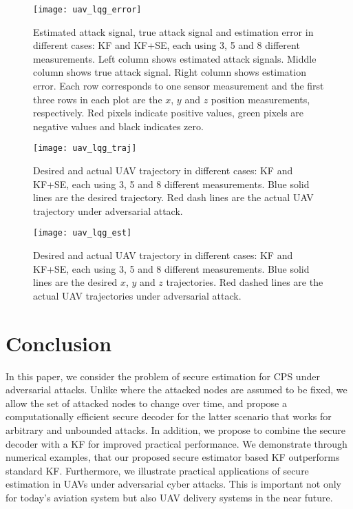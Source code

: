 \documentclass[journal]{IEEEtran}
\begin{document}
\begin{figure}
\center
\texttt{[image: uav\_lqg\_error]}
\caption{Estimated attack signal, true attack signal and estimation error in different cases: KF and KF+SE, each using 3, 5 and 8 different measurements. Left column shows estimated attack signals. Middle column shows true attack signal. Right column shows estimation error. Each row corresponds to one sensor measurement and the first three rows in each plot are the $x$, $y$ and $z$ position measurements, respectively. Red pixels indicate positive values, green pixels are negative values and black indicates zero.}
\label{fig:ex_uav_error}
\end{figure}



\begin{figure}
\center
\texttt{[image: uav\_lqg\_traj]}
\caption{Desired and actual UAV trajectory in different cases: KF and KF+SE, each using 3, 5 and 8 different measurements. Blue solid lines are the desired trajectory. Red dash lines are the actual UAV trajectory under adversarial attack.}
\label{fig:ex_uav_traj}
\end{figure}


\begin{figure}
\center
\texttt{[image: uav\_lqg\_est]}
\caption{Desired and actual UAV trajectory in different cases: KF and KF+SE, each using 3, 5 and 8 different measurements. Blue solid lines are the desired $x$, $y$ and $z$ trajectories. Red dashed lines are the actual UAV trajectories under adversarial attack.}
\label{fig:ex_uav_est}
\end{figure}





\section{Conclusion}
In this paper, we consider the problem of secure estimation for CPS under adversarial attacks. Unlike \cite{Fawzi2014} where the attacked nodes are assumed to be fixed, we allow the set of attacked nodes to change over time, and propose a computationally efficient secure decoder for the latter scenario that works for arbitrary and unbounded attacks. In addition, we propose to combine the secure decoder with a KF for improved practical performance. We demonstrate through numerical examples, that our proposed secure estimator based KF outperforms standard KF. Furthermore, we illustrate practical applications of secure estimation in UAVs under adversarial cyber attacks. This is important not only for today's aviation system but also UAV delivery systems in the near future. 
\end{document}
